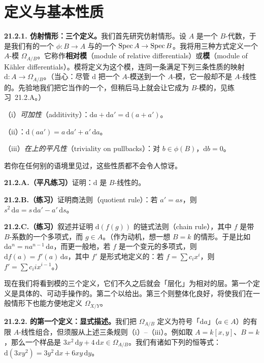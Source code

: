 
\section{定义与基本性质}

\textbf{21.2.1. 仿射情形：三个定义。}\quad 我们首先研究仿射情形。设 $A$ 是一个 $B$-代数，于是我们有\trRing{}的一个\trMorphism{} $\phi\colon B\to A$ 与\trScheme{}的一个\trMorphism{} $\operatorname{Spec} A\to\operatorname{Spec} B$。我将用三种方式定义一个 $A$-模 $\Omega_{A/B}$。它称作\textbf{相对\trDifferential{}模}（module of relative differentials）或\textbf{\trKahlerDifferentials{}模}（module of Kähler differentials）。\trDifferential{}模将定义为这个模，连同一条满足下列三条性质的映射 $\mathrm{d}\colon A\to\Omega_{A/B}$。（当心：尽管 $\mathrm{d}$ 把一个 $A$-模送到一个 $A$-模，它一般却不是 $A$-线性的。先验地我们把它当作\trAbelianGroups{}的一个\trHomomorphism，但稍后马上就会让它成为 $B$-模的\trHomomorphism，见\mbox{练习~21.2.A}。）

（i）\emph{可加性}（additivity）：$\mathrm{d}a+\mathrm{d}a'=\mathrm{d}(a+a')$。

（ii）\emph{\trLeibniz}：$\mathrm{d}(aa')=a\,\mathrm{d}a'+a'\,\mathrm{d}a$。

（iii）\emph{在\trPullback{}上的平凡性}（triviality on pullbacks）：对 $b\in\phi(B)$，$\mathrm{d}b=0$。

若你在任何别的语境里见过\trDifferential，这些性质都不会令人惊讶。

\textbf{21.2.A.（平凡练习）}\quad 证明：$\mathrm{d}$ 是 $B$-线性的。

\textbf{21.2.B.（练习）}\quad 证明商法则（quotient rule）：若 $a'=as$，则 $s^2\,\mathrm{d}a=s\,\mathrm{d}a'-a'\,\mathrm{d}s$。

\textbf{21.2.C.（练习）}\quad 叙述并证明 $\mathrm{d}(f(g))$ 的链式法则（chain rule），其中 $f$ 是带 $B$-系数的一个多项式，而 $g\in A$。（作为动机，想一想 $B=k$ 的情形。于是比如 $\mathrm{d}a^n=na^{n-1}\,\mathrm{d}a$，而更一般地，若 $f$ 是一个变元的多项式，则 $\mathrm{d}f(a)=f'(a)\,\mathrm{d}a$，其中 $f'$ 是形式地定义的：若 $f=\sum c_ix^i$，则 $f'=\sum c_iix^{i-1}$。）

现在我们将看到\trKahlerDifferentials{}模的三个定义，它们不久之后就会「层化」为相对\trDifferential{}的层。第一个定义是具体的、可动手操作的。第二个以\trUniversalProperty{}给出。第三个则整体化良好，将使我们在一般情形下也能方便地定义 $\Omega_{X/Y}$。

\textbf{21.2.2. \trDifferential{}的第一个定义：显式描述。}\quad 我们把 $\Omega_{A/B}$ 定义为符号「$\mathrm{d}a$」（$a\in A$）的有限 $A$-线性组合，但须服从上述三条规则（i）--（iii）。例如取 $A=k[x,y]$、$B=k$，那么一个样品\trDifferential{}是 $3x^2\,\mathrm{d}y+4\,\mathrm{d}x\in\Omega_{A/B}$。我们有诸如下列的恒等式：$\mathrm{d}(3xy^2)=3y^2\,\mathrm{d}x+6xy\,\mathrm{d}y$。

